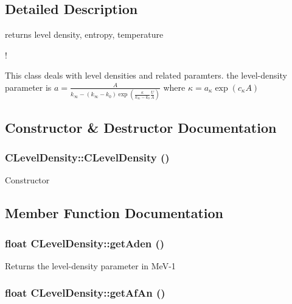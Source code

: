 \subsection{Detailed Description}
returns level density, entropy, temperature 

!

This class deals with level densities and related paramters. the level-density parameter is $a=\frac{A}{k_{\infty} - \left(k_{\infty} -k_{0} \right) \exp\left( \frac{\kappa}{k_{\infty}-k_{0}}\frac{U}{A}\right)}$ where $ \kappa = a_{\kappa} \exp\left(c_{\kappa} A\right) $ 



\subsection{Constructor \& Destructor Documentation}
\subsubsection{\setlength{\rightskip}{0pt plus 5cm}CLevel\-Density::CLevel\-Density ()\hspace{0.3cm}{\tt  [private]}}\label{classCLevelDensity_e6428caecb1135b705ac39adf873b135}


Constructor 

\subsection{Member Function Documentation}
\subsubsection{\setlength{\rightskip}{0pt plus 5cm}float CLevel\-Density::get\-Aden ()}\label{classCLevelDensity_29ce0edb568e2c2e261438e99dbebb81}


Returns the level-density parameter in Me\-V-1 
\subsubsection{\setlength{\rightskip}{0pt plus 5cm}float CLevel\-Density::get\-Af\-An ()\hspace{0.3cm}{\tt  [static]}}\label{classCLevelDensity_812ad4c5a5c2c41006a513a68a274d4b}


